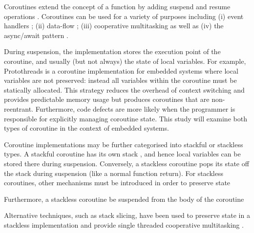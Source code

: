 Coroutines extend the concept of a function by adding suspend and resume operations \cite{Conway1963, Knuth1968, Marlin1979}. Coroutines can be used for a variety of purposes including (i) event handlers \cite{Dunkels2006}; (ii) data-flow \cite{Kugler2013}; (iii) cooperative multitasking \cite{Susilo2009} as well as (iv) the async/await pattern \cite{ISO2017}.

During suspension, the implementation stores the execution point of the coroutine, and usually (but not always) the state of local variables. For example, Protothreads \cite{Dunkels2006} is a coroutine implementation for embedded systems where local variables are not preserved: instead all variables within the coroutine must be statically allocated. This strategy reduces the overhead of context switching and provides predictable memory usage but produces coroutines that are non-reentrant. Furthermore, code defects are more likely when the programmer is responsible for explicitly managing coroutine state. This study will examine both types of coroutine in the context of embedded systems.

Coroutine implementations may be further categorised into stackful or stackless types. A stackful coroutine has its own stack \DIFaddbegin {}\DIFaddend , and hence local variables can be stored there during suspension. Conversely, a stackless coroutine pops its state off the stack during suspension (like a normal function return). \DIFdelbegin {}\DIFdelend For stackless coroutines, other mechanisms must be introduced in order to preserve state\DIFdelbegin {}\DIFdelend \DIFaddbegin {}

\DIFaddend Furthermore, a stackless coroutine \DIFdelbegin {}\DIFdelend \DIFaddbegin {}\DIFaddend be suspended from \DIFdelbegin {}\DIFdelend \DIFaddbegin {}\DIFaddend the body of the coroutine\DIFdelbegin {}\DIFdelend \DIFaddbegin {}

\DIFaddend Alternative techniques, such as stack slicing, have been used to preserve state in a stackless implementation and provide single threaded cooperative multitasking \cite{Tismer2000, Tismer2018}.

